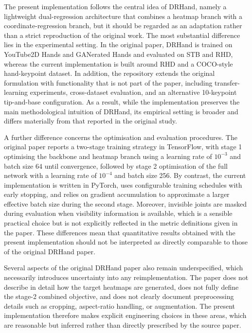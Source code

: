 \documentclass[10pt,letterpaper,twocolumn]{article}
\begin{document}
The present implementation follows the central idea of DRHand, namely a lightweight dual-regression architecture that combines a heatmap branch with a coordinate-regression branch, but it should be regarded as an adaptation rather than a strict reproduction of the original work. The most substantial difference lies in the experimental setting. In the original paper, DRHand is trained on YouTube2D Hands and GANerated Hands and evaluated on STB and RHD, whereas the current implementation is built around RHD and a COCO-style hand-keypoint dataset. In addition, the repository extends the original formulation with functionality that is not part of the paper, including transfer-learning experiments, cross-dataset evaluation, and an alternative 10-keypoint tip-and-base configuration. As a result, while the implementation preserves the main methodological intuition of DRHand, its empirical setting is broader and differs materially from that reported in the original study.

A further difference concerns the optimisation and evaluation procedures. The original paper reports a two-stage training strategy in TensorFlow, with stage 1 optimising the backbone and heatmap branch using a learning rate of $10^{-3}$ and batch size 64 until convergence, followed by stage 2 optimisation of the full network with a learning rate of $10^{-4}$ and batch size 256. By contrast, the current implementation is written in PyTorch, uses configurable training schedules with early stopping, and relies on gradient accumulation to approximate a larger effective batch size during the second stage. Moreover, invisible joints are masked during evaluation when visibility information is available, which is a sensible practical choice but is not explicitly reflected in the metric definitions given in the paper. These differences mean that quantitative results obtained with the present implementation should not be interpreted as directly comparable to those of the original DRHand paper.

Several aspects of the original DRHand paper also remain underspecified, which necessarily introduces uncertainty into any reimplementation. The paper does not describe in detail how the target heatmaps are generated, does not fully define the stage-2 combined objective, and does not clearly document preprocessing details such as cropping, aspect-ratio handling, or augmentation. The present implementation therefore makes explicit engineering choices in these areas, which are reasonable but inferred rather than directly prescribed by the source paper.
\end{document}
